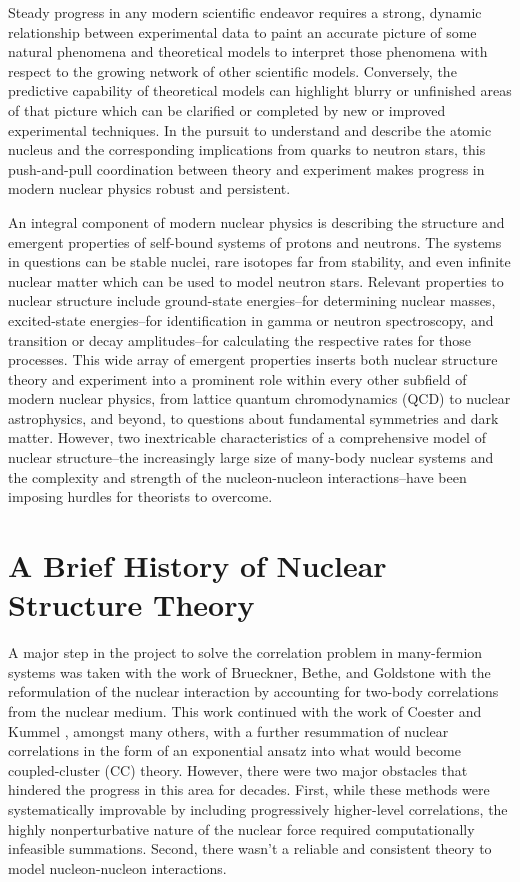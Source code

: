 \documentclass[../thesis.tex]{subfiles}
\begin{document}
Steady progress in any modern scientific endeavor requires a strong, dynamic relationship between experimental data to paint an accurate picture of some natural phenomena and theoretical models to interpret those phenomena with respect to the growing network of other scientific models. Conversely, the predictive capability of theoretical models can highlight blurry or unfinished areas of that picture which can be clarified or completed by new or improved experimental techniques. In the pursuit to understand and describe the atomic nucleus and the corresponding implications from quarks to neutron stars, this push-and-pull coordination between theory and experiment makes progress in modern nuclear physics robust and persistent.

An integral component of modern nuclear physics is describing the structure and emergent properties of self-bound systems of protons and neutrons. The systems in questions can be stable nuclei, rare isotopes far from stability, and even infinite nuclear matter which can be used to model neutron stars. Relevant properties to nuclear structure include ground-state energies--for determining nuclear masses, excited-state energies--for identification in gamma or neutron spectroscopy, and transition or decay amplitudes--for calculating the respective rates for those processes. This wide array of emergent properties inserts both nuclear structure theory and experiment into a prominent role within every other subfield of modern nuclear physics, from lattice quantum chromodynamics (QCD) to nuclear astrophysics, and beyond, to questions about fundamental symmetries and dark matter.  However, two inextricable characteristics of a comprehensive model of nuclear structure--the increasingly large size of many-body nuclear systems and the complexity and strength of the nucleon-nucleon interactions--have been imposing hurdles for theorists to overcome.


\section{A Brief History of Nuclear Structure Theory}

A major step in the project to solve the correlation problem in many-fermion systems was taken with the work of Brueckner, Bethe, and Goldstone \cite{BRUECKNER19551344,BETHE19561353,GOLDSTONE1957267} with the reformulation of the nuclear interaction by accounting for two-body correlations from the nuclear medium.  This work continued with the work of Coester \cite{COESTER1958421,COESTER1960477} and Kummel \cite{KUMMEL19781}, amongst many others, with a further resummation of nuclear correlations in the form of an exponential ansatz into what would become coupled-cluster (CC) theory.  However, there were two major obstacles that hindered the progress in this area for decades.  First, while these methods were systematically improvable by including progressively higher-level correlations, the highly nonperturbative nature of the nuclear force required computationally infeasible summations.  Second, there wasn't a reliable and consistent theory to model nucleon-nucleon interactions.
\end{document}
